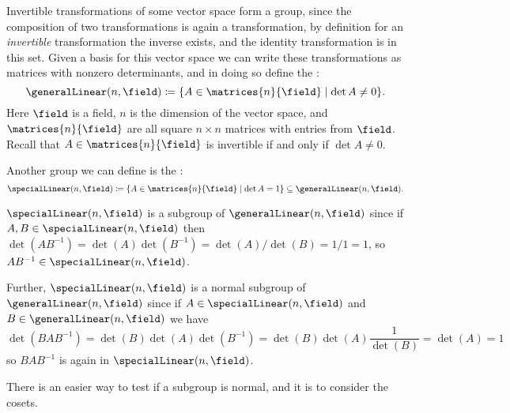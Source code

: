 \documentclass[fleqn]{NotesClass}
\begin{document}
    \begin{exm}{}{}
        Invertible transformations of some vector space form a group, since the composition of two transformations is again a transformation, by definition for an \emph{invertible} transformation the inverse exists, and the identity transformation is in this set.
        Given a basis for this vector space we can write these transformations as matrices with nonzero determinants, and in doing so define the :
        \begin{equation}
            \generalLinear(n, \field) \coloneqq \{A \in \matrices{n}{\field} \mid \det A \ne 0\}.
        \end{equation}
        Here \(\field\) is a field, \(n\) is the dimension of the vector space, and \(\matrices{n}{\field}\) are all square \(n\times n\) matrices with entries from \(\field\).
        Recall that \(A \in \matrices{n}{\field}\) is invertible if and only if \(\det A \ne 0\).
        
        Another group we can define is the :
        \begin{equation}
            \specialLinear(n, \field) \coloneqq \{A \in \matrices{n}{\field} \mid \det A = 1\} \subseteq \generalLinear(n, \field).
        \end{equation}
        
        \(\specialLinear(n, \field)\) is a subgroup of \(\generalLinear(n, \field)\) since if \(A, B \in \specialLinear(n, \field)\) then \(\det(AB^{-1}) = \det(A)\det(B^{-1}) = \det(A)/\det(B) = 1/1 = 1\), so \(AB^{-1} \in \specialLinear(n, \field)\).
        
        Further, \(\specialLinear(n, \field)\) is a normal subgroup of \(\generalLinear(n, \field)\) since if \(A \in \specialLinear(n, \field)\) and \(B \in \generalLinear(n, \field)\) we have
        \begin{equation*}
            \det(BAB^{-1}) = \det(B)\det(A)\det(B^{-1}) = \det(B)\det(A)\frac{1}{\det(B)} = \det(A) = 1
        \end{equation*}
        so \(BAB^{-1}\) is again in \(\specialLinear(n, \field)\).
    \end{exm}
    
    There is an easier way to test if a subgroup is normal, and it is to consider the cosets.
    
\end{document}
